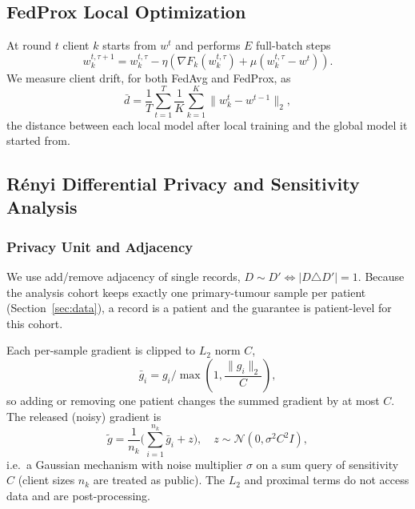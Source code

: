 \documentclass[journal]{IEEEtran}
\begin{document}
\subsection{FedProx Local Optimization}
At round $t$ client $k$ starts from $w^t$ and performs $E$ full-batch steps
\begin{equation}
w_k^{t, \tau+1} = w_k^{t, \tau} - \eta \left( \nabla F_k(w_k^{t, \tau}) + \mu (w_k^{t, \tau} - w^t) \right).
\end{equation}
We measure client drift, for both FedAvg and FedProx, as
\begin{equation}
\bar d = \frac{1}{T}\sum_{t=1}^{T} \frac{1}{K}\sum_{k=1}^{K} \big\| w_k^{t} - w^{t-1} \big\|_2 ,
\label{eq:drift}
\end{equation}
the distance between each local model after local training and the global model it started from.

\subsection{Rényi Differential Privacy and Sensitivity Analysis}

\subsubsection{Privacy Unit and Adjacency}
We use add/remove adjacency of single records, $D \sim D' \iff |D \triangle D'| = 1$. Because the analysis cohort keeps exactly one primary-tumour sample per patient (Section~\ref{sec:data}), a record is a patient and the guarantee is patient-level for this cohort.

Each per-sample gradient is clipped to $L_2$ norm $C$,
\begin{equation}
\bar{g}_i = g_i / \max\left(1, \frac{\|g_i\|_2}{C}\right),
\end{equation}
so adding or removing one patient changes the summed gradient by at most $C$. The released (noisy) gradient is
\begin{equation}
\tilde{g} = \frac{1}{n_k}\Big(\sum_{i=1}^{n_k} \bar{g}_i + z\Big), \quad z \sim \mathcal{N}\left(0, \sigma^2 C^2 I\right),
\end{equation}
i.e.\ a Gaussian mechanism with noise multiplier $\sigma$ on a sum query of sensitivity $C$ (client sizes $n_k$ are treated as public). The $L_2$ and proximal terms do not access data and are post-processing.
\end{document}
